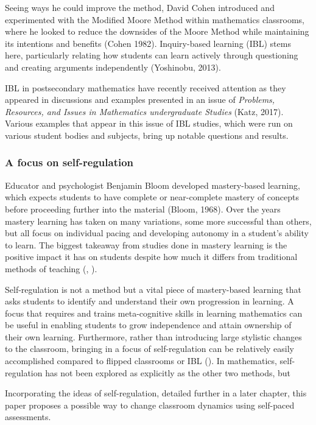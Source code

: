 Seeing ways he could improve the method, David Cohen introduced and experimented with the Modified Moore Method within mathematics classrooms, where he looked to reduce the downsides of the Moore Method while maintaining its intentions and benefits (Cohen 1982). Inquiry-based learning (IBL) stems here, particularly relating how students can learn actively through questioning and creating arguments independently (Yoshinobu, 2013).

IBL in postsecondary mathematics have recently received attention as they appeared in discussions and examples presented in an issue of {\it Problems, Resources, and Issues in Mathematics undergraduate Studies} (Katz, 2017). Various examples that appear in this issue of IBL studies, which were run on various student bodies and subjects, bring up notable questions and results.

\subsubsection{A focus on self-regulation}
Educator and psychologist Benjamin Bloom developed mastery-based learning, which expects students to have complete or near-complete mastery of concepts before proceeding further into the material (Bloom, 1968). Over the years mastery learning has taken on many variations, some more successful than others, but all focus on individual pacing and developing autonomy in a student's ability to learn. The biggest takeaway from studies done in mastery learning is the positive impact it has on students despite how much it differs from traditional methods of teaching (\cite{zollinger_impact_2017}, \cite{bradley_evaluating_2017}).

Self-regulation is not a method but a vital piece of mastery-based learning that asks students to identify and understand their own progression in learning. A focus that requires and trains meta-cognitive skills in learning mathematics can be useful in enabling students to grow independence and attain ownership of their own learning. Furthermore, rather than introducing large stylistic changes to the classroom, bringing in a focus of self-regulation can be relatively easily accomplished compared to flipped classrooms or IBL (\cite{montague_self-regulation_2007}). In mathematics, self-regulation has not been explored as explicitly as the other two methods, but

Incorporating the ideas of self-regulation, detailed further in a later chapter, this paper proposes a possible way to change classroom dynamics using self-paced assessments.

